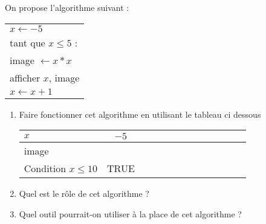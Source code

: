 On propose l'algorithme suivant :

\begin{tabular}{|l|}
\hline 
$x	\longleftarrow -5$ \\ 
tant que $x \leq 5$ : \\ 
\quad \quad image	$\longleftarrow x*x$\\ 
\quad \quad afficher $x$, image \\ 
\quad \quad $x \longleftarrow x + 1$ \\ 
\hline 
\end{tabular} 

\begin{enumerate}
\item Faire fonctionner cet algorithme en utilisant le tableau ci dessous

\begin{tabular}{|p{2.5cm}|c|>{\centering\arraybackslash}p{0.7cm}|>{\centering\arraybackslash}p{0.7cm}|>{\centering\arraybackslash}p{0.7cm}|>{\centering\arraybackslash}p{0.7cm}|>{\centering\arraybackslash}p{0.7cm}|>{\centering\arraybackslash}p{0.7cm}|>{\centering\arraybackslash}p{0.7cm}|>{\centering\arraybackslash}p{0.7cm}|>{\centering\arraybackslash}p{0.7cm}|>{\centering\arraybackslash}p{0.7cm}|>{\centering\arraybackslash}p{0.7cm}|}
\hline 
$x$ & $-5$ &  &  &  &  &  &  &  &  &  &  &  \\ 
\hline 
image &  &  &  &  &  &  &  &  &  &  &  &  \\ 
\hline 
Condition $x \leq 10$ & TRUE &  &  &  &  &  &  &  &  &  &  &  \\  
\hline 
\end{tabular} 

\item Quel est le rôle de cet algorithme ?
\item Quel outil pourrait-on utiliser à la place de cet algorithme ?

\end{enumerate}


 
 
